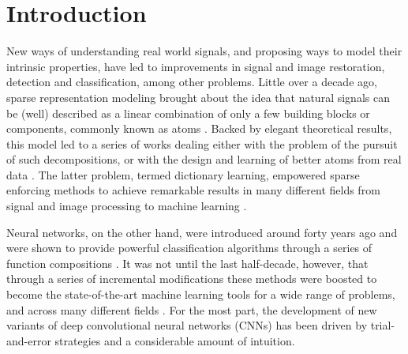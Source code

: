 \documentclass[10pt,journal]{IEEEtran}
\theoremstyle{plain}
\theoremstyle{definition}
\begin{document}
\maketitle

\IEEEdisplaynontitleabstractindextext

\IEEEpeerreviewmaketitle



\section{Introduction}

New ways of understanding real world signals, and proposing ways to model their intrinsic properties, have led to improvements in signal and image restoration, detection and classification, among other problems. Little over a decade ago, sparse representation modeling brought about the idea that natural signals can be (well) described as a linear combination of only a few building blocks or components, commonly known as atoms \cite{Bruckstein2009}. Backed by elegant theoretical results, this model led to a series of works dealing either with the problem of the pursuit of such decompositions, or with the design and learning of better atoms from real data \cite{Rubinstein2010_dict}. The latter problem, termed dictionary learning, empowered sparse enforcing methods to achieve remarkable results in many different fields from signal and image processing \cite{Sulam2014,Romano2014,Mairal2009} to machine learning \cite{Jiang2013,patel2014dictionaries,shrivastava2014multiple}.

Neural networks, on the other hand, were introduced around forty years ago and were shown to provide powerful classification algorithms through a series of function compositions \cite{lecun1990handwritten,rumelhart1988learning}.  It was not until the last half-decade, however, that through a series of incremental modifications these methods were boosted to become the state-of-the-art machine learning tools for a wide range of problems, and across many different fields \cite{lecun2015deep}. For the most part, the development of new variants of deep convolutional neural networks (CNNs) has been driven by trial-and-error strategies and a considerable amount of intuition. 
\end{document}
